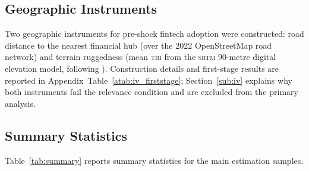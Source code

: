 \subsection{Geographic Instruments}
\label{sub:instruments}

Two geographic instruments for pre-shock fintech adoption were constructed:
road distance to the nearest financial hub (over the 2022 OpenStreetMap road
network) and terrain ruggedness (mean \textsc{tri} from the \textsc{srtm}
90-metre digital elevation model, following \citealt{hjort2019arrival}).
Construction details and first-stage results are reported in
Appendix~Table~\ref{atab:iv_firststage}; Section~\ref{sub:iv} explains why
both instruments fail the relevance condition and are excluded from the
primary analysis.

\subsection{Summary Statistics}

Table~\ref{tab:summary} reports summary statistics for the main estimation
samples.


